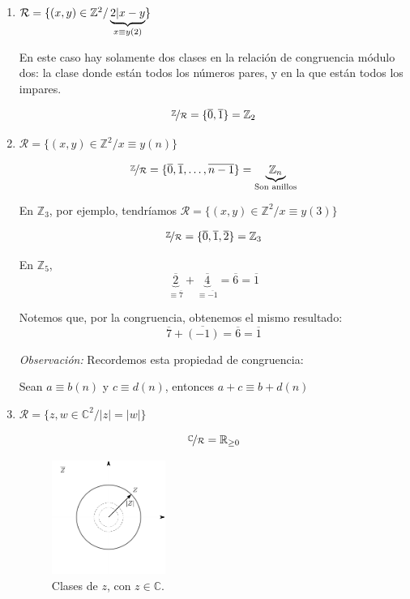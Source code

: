 \begin{enumerate}
    \item $\mathcal{R} = \{ (x,y) \in \mathbb{Z}^2 / 
        \underbrace{\divides{2}{x-y}}_{x \equiv y (2)} \}$ 

        En este caso hay solamente dos clases en la relación de congruencia
        módulo dos: la clase donde están todos los números pares, y en la que
        están todos los impares.

        \[ \nicefrac{\mathbb{Z}}{\mathcal{R}} 
            = \{ \overline{0}, \overline{1} \} 
        = \mathbb{Z}_2 \]

    \item $\mathcal{R} = \{ (x,y) \in \mathbb{Z}^2 / x \equiv y (n) \}$

        \[ \nicefrac{\mathbb{Z}}{\mathcal{R}} 
        = \{\overline{0}, \overline{1}, \dotsc, \overline{n-1} \} 
        = \underbrace{\mathbb{Z}_n}_{\text{Son anillos}} \]

        En $\mathbb{Z}_3$, por ejemplo, tendríamos 
        $\mathcal{R}=\{ (x,y)\in \mathbb{Z}^2 / x \equiv y(3) \}$

        \begin{gather*}
            \nicefrac{\mathbb{Z}}{\mathcal{R}} = \{ \overline{0},
            \overline{1},\overline{2} \} = \mathbb{Z}_3
        \end{gather*}
        
        En $\mathbb{Z}_5$, 
        \[\underbrace{\overline{2}}_{\equiv \overline{7}} 
        + \underbrace{\overline{4}}_{\equiv \overline{-1}} 
        = \overline{6} = \overline{1} \]

        Notemos que, por la congruencia, obtenemos el mismo resultado:
        \[ \overline{7} + \overline{(-1)} = \overline{6} = \overline{1} \]

        \bigskip
        \textit{Observación:} 
        Recordemos esta propiedad de congruencia:

        Sean $a \equiv b(n)$ y $c \equiv d (n)$, entonces $a+c \equiv b+d(n)$

    \item $\mathcal{R} = \{z,w \in \mathbb{C}^2 / |z| = |w| \}$

        \[ \nicefrac{\mathbb{C}}{\mathcal{R}} = \mathbb{R}_{\geq 0}\]

        \begin{figure}[H]
            \centering
            \includegraphics[width=0.35\textwidth]{clase_de_z_complejo.png}
            \caption{Clases de $z$, con $z \in \mathbb{C}$.}
        \end{figure}


\end{enumerate}
